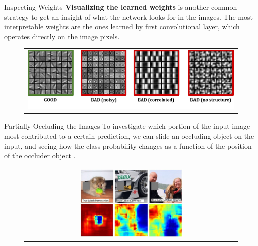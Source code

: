 \documentclass[aspectratio=169]{beamer}
\begin{document}
\begin{frame}{Inspecting Weights}
\textbf{Visualizing the learned weights} is another common strategy to get an insight of what the network looks for in the images. The most interpretable weights are the ones learned by first convolutional layer, which operates directly on the image pixels.
\begin{figure}
\begin{tabular}{c}
\includegraphics[width=\textwidth]{img/cnn/weights_inspection.png}
\end{tabular}
\end{figure}

\end{frame}


\begin{frame}{Partially Occluding the Images}
To investigate which portion of the input image most contributed to a certain prediction, we can slide an occluding object on the input, and seeing how the class probability changes as a function of the position of the occluder object \cite{zeiler2014visualizing}.
\begin{figure}
\begin{tabular}{c}
\includegraphics[width=0.5\textwidth]{img/cnn/occlusions.jpg}
\end{tabular}
\end{figure}
\end{frame}

\end{document}
